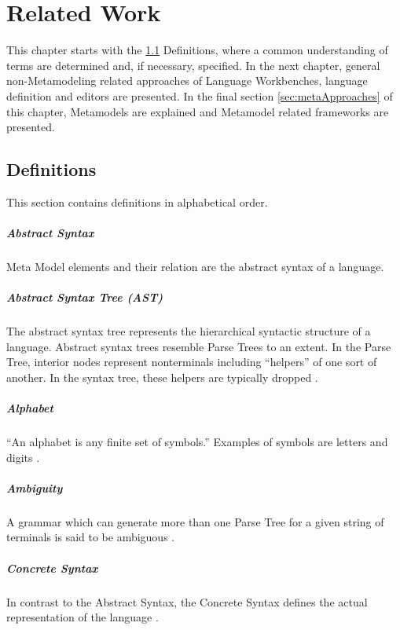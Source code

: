 \chapter{Related Work}
This chapter starts with the \ref{sec:def} Definitions, where a common understanding of terms are determined and, if necessary, specified. In the next chapter, general non-Metamodeling related approaches of Language Workbenches, language definition and editors are presented. In the final section \ref{sec:metaApproaches} of this chapter, Metamodels are explained and Metamodel related frameworks are presented.

\section{Definitions} \label{sec:def}
This section contains definitions in alphabetical order. 
\paragraph{Abstract Syntax} Meta Model elements and their relation are the abstract syntax of a language. \cite{MDSD}

\paragraph{Abstract Syntax Tree (AST)}  
The abstract syntax tree represents the hierarchical syntactic structure of a language.  Abstract syntax trees resemble Parse Trees to an extent. In the Parse Tree, interior nodes represent nonterminals including ``helpers'' of one sort of another. In the syntax tree, these helpers are typically dropped \cite{DragonBook}.

\paragraph{Alphabet}
``An alphabet is any finite set of symbols.'' Examples of symbols are letters and digits \cite{DragonBook}.


\paragraph{Ambiguity} 
A grammar which can generate more than one Parse Tree for a given string of terminals is said to be ambiguous \cite{DragonBook}.

 
\paragraph{Concrete Syntax} In contrast to the Abstract Syntax, the Concrete Syntax defines the actual representation of the language \cite{MDSD}.

